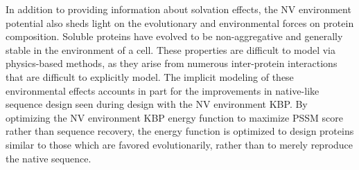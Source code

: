 In addition to providing information about solvation effects, the \ac{NV} environment potential also sheds light on the evolutionary and environmental forces on protein composition.
Soluble proteins have evolved to be non-aggregative and generally stable in the environment of a cell.
These properties are difficult to model via physics-based methods, as they arise from numerous inter-protein interactions that are difficult to explicitly model.
The implicit modeling of these environmental effects accounts in part for the improvements in native-like sequence design seen during design with the \ac{NV} environment \ac{KBP}.
By optimizing the \ac{NV} environment \ac{KBP} energy function to maximize \ac{PSSM} score rather than sequence recovery, the energy function is optimized to design proteins similar to those which are favored evolutionarily, rather than to merely reproduce the native sequence.